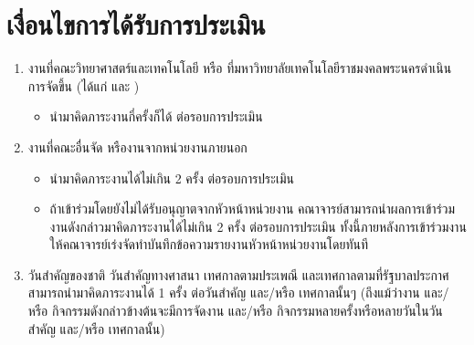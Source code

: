 \documentclass[a4paper,12pt,english]{sphinxmanual}
\begin{document}
\section{เงื่อนไขการได้รับการประเมิน}
\label{\detokenize{4culture:id2}}\begin{enumerate}
%
\item {} 
งานที่คณะวิทยาศาสตร์และเทคโนโลยี หรือ ที่มหาวิทยาลัยเทคโนโลยีราชมงคลพระนครดำเนินการจัดขึ้น (ได้แก่ {\hyperref[\detokenize{4culture:id4}]{}} และ {\hyperref[\detokenize{4culture:id13}]{}})
\begin{itemize}
\item {} 
นำมาคิดภาระงานกี่ครั้งก็ได้ ต่อรอบการประเมิน

\end{itemize}

\item {} 
งานที่คณะอื่นจัด หรืองานจากหน่วยงานภายนอก
\begin{itemize}
\item {} 
นำมาคิดภาระงานได้ไม่เกิน 2 ครั้ง ต่อรอบการประเมิน

\item {} 
ถ้าเข้าร่วมโดยยังไม่ได้รับอนุญาตจากหัวหน้าหน่วยงาน คณาจารย์สามารถนำผลการเข้าร่วมงานดังกล่าวมาคิดภาระงานได้ไม่เกิน 2 ครั้ง ต่อรอบการประเมิน ทั้งนี้ภายหลังการเข้าร่วมงานให้คณาจารย์เร่งจัดทำบันทึกข้อความรายงานหัวหน้าหน่วยงานโดยทันที

\end{itemize}

\item {} 
วันสำคัญของชาติ วันสำคัญทางศาสนา เทศกาลตามประเพณี และเทศกาลตามที่รัฐบาลประกาศ สามารถนำมาคิดภาระงานได้ 1 ครั้ง ต่อวันสำคัญ และ/หรือ เทศกาลนั้นๆ (ถึงแม้ว่างาน และ/หรือ กิจกรรมดังกล่าวข้างต้นจะมีการจัดงาน และ/หรือ กิจกรรมหลายครั้งหรือหลายวันในวันสำคัญ และ/หรือ เทศกาลนั้น)

\end{enumerate}
\end{document}
